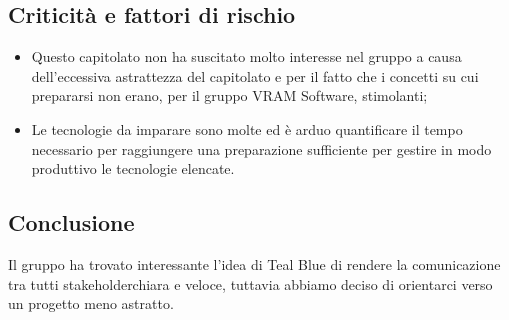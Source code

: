 \subsection{Criticità e fattori di rischio}
\begin{itemize}
	\item Questo capitolato non ha suscitato molto interesse nel gruppo a causa dell'eccessiva astrattezza del capitolato e per il fatto che i concetti su cui prepararsi non erano, per il gruppo VRAM Software, stimolanti;
	\item Le tecnologie da imparare sono molte ed è arduo quantificare il tempo necessario per raggiungere una preparazione sufficiente per gestire in modo produttivo le tecnologie elencate.
\end{itemize}
\subsection{Conclusione}
Il gruppo ha trovato interessante l'idea di Teal Blue di rendere la comunicazione tra tutti stakeholder\glosp chiara e veloce, tuttavia abbiamo deciso di orientarci verso un progetto meno astratto.